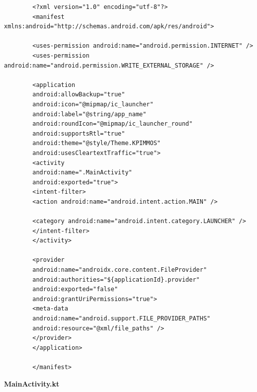 \documentclass[14pt, a4paper]{extreport}
\begin{document}
	\begin{verbatim} 
		<?xml version="1.0" encoding="utf-8"?>
		<manifest xmlns:android="http://schemas.android.com/apk/res/android">
		
		<uses-permission android:name="android.permission.INTERNET" />
		<uses-permission android:name="android.permission.WRITE_EXTERNAL_STORAGE" />
		
		<application
		android:allowBackup="true"
		android:icon="@mipmap/ic_launcher"
		android:label="@string/app_name"
		android:roundIcon="@mipmap/ic_launcher_round"
		android:supportsRtl="true"
		android:theme="@style/Theme.KPIMMOS"
		android:usesCleartextTraffic="true">
		<activity
		android:name=".MainActivity"
		android:exported="true">
		<intent-filter>
		<action android:name="android.intent.action.MAIN" />
		
		<category android:name="android.intent.category.LAUNCHER" />
		</intent-filter>
		</activity>
		
		<provider
		android:name="androidx.core.content.FileProvider"
		android:authorities="${applicationId}.provider"
		android:exported="false"
		android:grantUriPermissions="true">
		<meta-data
		android:name="android.support.FILE_PROVIDER_PATHS"
		android:resource="@xml/file_paths" />
		</provider>
		</application>
		
		</manifest>
	\end{verbatim}
	
	\textbf{MainActivity.kt}
	
\end{document}
